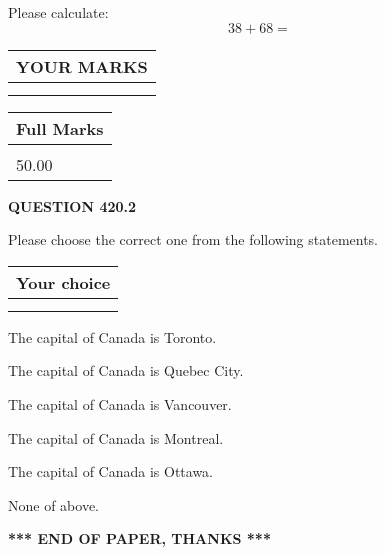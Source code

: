 \documentclass[12pt]{article}
\begin{document}
  
 
Please calculate:
\begin{equation}
38 +  %
68 = \nonumber
\end{equation}
 

 

 
  
\vspace{0.2in}
  
\noindent\begin{tabular}{|l|}
\hline
 YOUR MARKS  \\
\hline
 \\ 
 \\ 
\hline
\end{tabular}
\hspace{0.05in} \begin{tabular}{|l|}
\hline
 Full Marks  \\
\hline
 \\ 
50.00 \\
\hline
\end{tabular}
{\textbf{\Large{QUESTION
420.2 
}}}
  
  
Please choose the correct one from the following statements.
  
  
\noindent\hspace{3.0in} \begin{tabular}{|l|}
\hline
Your choice \\
\hline
 \\ 
 \\ 
\hline
\end{tabular}
  
  
 
 
The capital of Canada is Toronto.
 
 
The capital of Canada is Quebec City.
 
 
The capital of Canada is Vancouver.
 
 
The capital of Canada is Montreal.
 
 
The capital of Canada is Ottawa.
 
 
 None of above.
 
 
   
   
 \vspace{0.2in}
 
   
   
   
   
\vspace{1.0in} 
{\textbf{\large{ *** END OF PAPER, THANKS *** }}} 
   
\end{document}
